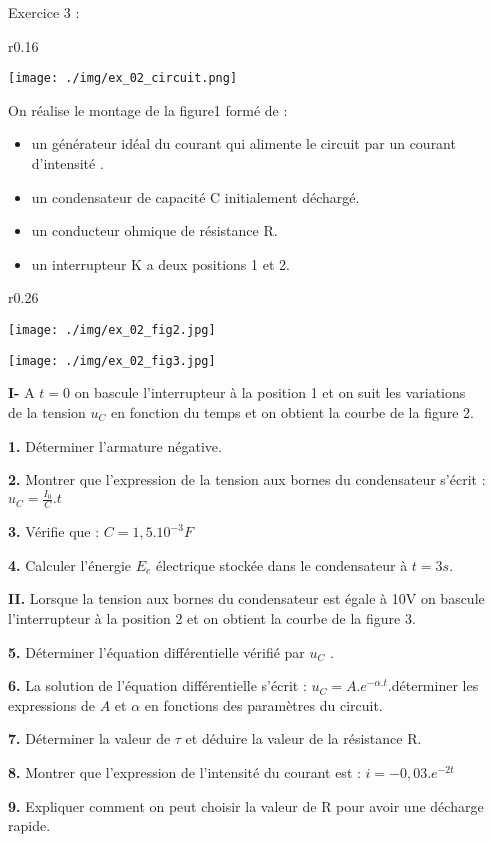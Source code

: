 \documentclass[12pt, french]{article}
\begin{document}
\begin{Box2}{Exercice 3 :  }
\begin{wrapfigure}{r}{0.16\textwidth}
  \begin{center}
	  \vspace{-0.6cm}
	\texttt{[image: ./img/ex\_02\_circuit.png]}
	\caption{}
  \end{center}
\end{wrapfigure}

On réalise le montage de la figure1 formé de :
\begin{itemize}
	\item un générateur idéal du courant qui alimente le circuit par un courant d’intensité .
	\item un condensateur de capacité C initialement déchargé.
	\item un conducteur ohmique de résistance R.
	\item un interrupteur K a deux positions 1 et 2.
\end{itemize}

\begin{wrapfigure}{r}{0.26\textwidth}
  \begin{center}
	  \vspace{-5cm}
	\texttt{[image: ./img/ex\_02\_fig2.jpg]}
	\caption{}
	\texttt{[image: ./img/ex\_02\_fig3.jpg]}
	\caption{}
  \end{center}
\end{wrapfigure}



\textbf{I- }A $t=0$ on bascule l’interrupteur à la position 1 et on suit les variations \\de la tension $u_C$ en fonction du temps et on obtient la courbe de la figure 2.

\textbf{1. }Déterminer l’armature négative.

\textbf{2. }Montrer que l’expression de la tension aux bornes du
condensateur s’écrit : $u_C = \frac{I_0}{C}.t$

\textbf{3. }Vérifie que : $C =1,5.10^{-3}F $

\textbf{4. }Calculer l’énergie $E_e$ électrique stockée dans le condensateur à $t= 3s$.

\textbf{II. }Lorsque la tension aux bornes du condensateur est égale à 10V on bascule l’interrupteur à la position 2 et on obtient la courbe de la figure 3.

\textbf{5. }Déterminer l’équation différentielle vérifié par $u_C$ .

\textbf{6. }La solution de l’équation différentielle s’écrit : $u_C = A.e^{-\alpha.t}$.déterminer les expressions de $A$ et $\alpha$ en fonctions des paramètres du circuit.

\textbf{7. }Déterminer la valeur de $\tau$ et déduire la valeur de la résistance R.

\textbf{8. }Montrer que l’expression de l’intensité du courant est : $i = -0,03.e^{-2t}$

\textbf{9. }Expliquer comment on peut choisir la valeur de R pour avoir une décharge rapide.
\end{Box2}
\end{document}
